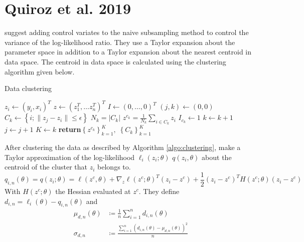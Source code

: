 \section{Quiroz et al. 2019}
\cite{quiroz2019speeding} suggest adding control variates to the naive subsampling method to control the variance of the log-likelihood ratio. They use a Taylor expansion about the parameter space in addition to a Taylor expansion about the nearest centroid in data space. The centroid in data space is calculated using the clustering algorithm given below. 
\begin{algorithm}
\caption{Data clustering}
\label{algo:clustering}
\begin{algorithmic}[1]
    \State $z_i \gets \left(y_i, x_i\right)^T$
    \State $z \gets \left(z_1^T, \ldots z_n^T\right)^T $
    \State $I \gets \left(0, \ldots, 0\right)^T$ 
    \State $\left(j,k\right) \gets \left(0,0\right)$
    \State $C_k \gets \left\{i; \lVert z_j - z_i \rVert \leq \epsilon\right\}  $
    \State $N_k = \left| C_k\right|$ 
    \State $z^{c_k} = \frac{1}{N_k} \sum_{i\in C_k} z_i$
    \State $I_{c_k} \gets 1$
    \State $k\gets k+1$
    \EndIf
    \State $j \gets j+1$
    \EndWhile
    \State $K\gets k$
    \State \textbf{return}$\left\{z^{c_k}\right\}_{k = 1}^K, \; \left\{C_k\right\}_{k=1}^K$
    \EndFunction
    \end{algorithmic}
\end{algorithm}{}
After clustering the data as described by Algorithm \ref{algo:clustering}, \cite{quiroz2019speeding} make a Taylor approximation of the log-likelihood $\ell_i\left(z_i;\theta\right)$ $q\left(z_i, \theta\right)$ about the centroid of the cluster that $z_i$ belongs to.  
\begin{equation}
    q_{i, n}\left(\theta\right) = q\left(z_i;\theta\right) = \ell\left(z^c, \theta\right) + \nabla_z \ell\left(z^c; \theta\right)^T \left(z_i - z^c \right) + \frac{1}{2}\left(z_i - z^c\right)^T H\left(z^c;\theta\right)\left(z_i - z^c\right)
\end{equation}
With $H\left(z^c; \theta\right)$ the Hessian evaluated at $z^c$. 
They define $d_{i, n} = \ell_i\left(\theta\right) - q_{i,n}\left(\theta\right)$ and 
\begin{equation*}
\begin{split}
    \mu_{d,n}\left(\theta\right) &\coloneqq \frac{1}{n}\sum_{i = 1}^n d_{i,n}\left(\theta\right) \\
    \sigma_{d,n} &\coloneqq \frac{\sum_{i=1}^n\left(d_{i,n}\left(\theta\right) - \mu_{d,n}\left(\theta\right)\right)^2}{n}
\end{split}
\end{equation*}{}
